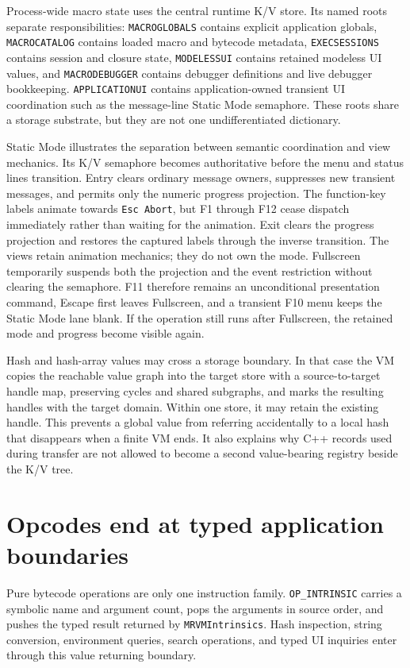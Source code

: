 \documentclass[a4paper,10pt,twoside,openany]{book}
\begin{document}
Process-wide macro state uses the central runtime K/V store. Its named roots
separate responsibilities:
\texttt{MACROGLOBALS} contains explicit application globals,
\texttt{MACROCATALOG} contains loaded macro and bytecode metadata,
\texttt{EXECSESSIONS} contains session and closure state,
\texttt{MODELESSUI} contains retained modeless UI values, and
\texttt{MACRODEBUGGER} contains debugger definitions and live debugger
bookkeeping. \texttt{APPLICATIONUI} contains application-owned transient UI
coordination such as the message-line Static Mode semaphore. These roots share
a storage substrate, but they are not one
undifferentiated dictionary.

Static Mode illustrates the separation between semantic coordination and view
mechanics. Its K/V semaphore becomes authoritative before the menu and status
lines transition. Entry clears ordinary message owners, suppresses new
transient messages, and permits only the numeric progress projection. The
function-key labels animate towards \texttt{Esc Abort}, but F1 through F12
cease dispatch immediately rather than waiting for the animation. Exit clears
the progress projection and restores the captured labels through the inverse
transition. The views retain animation mechanics; they do not own the mode.
Fullscreen temporarily suspends both the projection and the event restriction
without clearing the semaphore. F11 therefore remains an unconditional
presentation command, Escape first leaves Fullscreen, and a transient F10 menu
keeps the Static Mode lane blank. If the operation still runs after Fullscreen,
the retained mode and progress become visible again.

Hash and hash-array values may cross a storage boundary. In that case the VM
copies the reachable value graph into the target store with a source-to-target
handle map, preserving cycles and shared subgraphs, and marks the resulting
handles with the target domain. Within one store, it may retain the existing
handle. This prevents a global value from referring accidentally to a local
hash that disappears when a finite VM ends. It also explains why C++ records
used during transfer are not allowed to become a second value-bearing registry
beside the K/V tree.

\section{Opcodes end at typed application boundaries}

Pure bytecode operations are only one instruction family.
\texttt{OP\_INTRINSIC} carries a symbolic name and argument count, pops the
arguments in source order, and pushes the typed result returned by
\texttt{MRVMIntrinsics}. Hash inspection, string conversion, environment
queries, search operations, and typed UI inquiries enter through this value
returning boundary.
\end{document}
